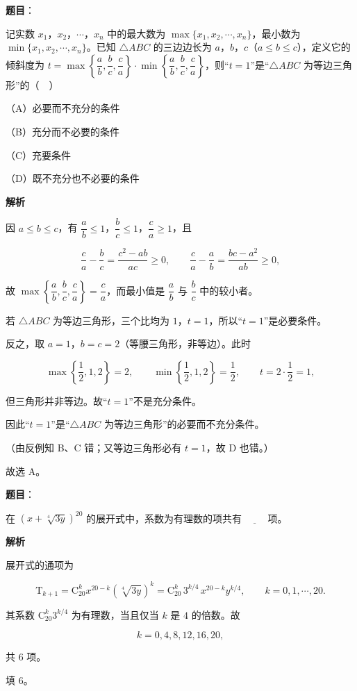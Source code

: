 \begin{answer}

\textbf{题目}：

记实数 $x_1$，$x_2$，$\cdots$，$x_n$ 中的最大数为 $\max\{x_1,x_2,\cdots,x_n\}$，最小数为 $\min\{x_1,x_2,\cdots,x_n\}$。已知 $\triangle ABC$ 的三边边长为 $a$，$b$，$c$（$a\leqslant b\leqslant c$），定义它的倾斜度为 $t=\max\left\{\dfrac ab,\dfrac bc,\dfrac ca\right\}\cdot\min\left\{\dfrac ab,\dfrac bc,\dfrac ca\right\}$，则“$t=1$”是“$\triangle ABC$ 为等边三角形”的（　）

（A）必要而不充分的条件

（B）充分而不必要的条件

（C）充要条件

（D）既不充分也不必要的条件

\textbf{解析}

因 $a\leqslant b\leqslant c$，有 $\dfrac ab\leqslant1$，$\dfrac bc\leqslant1$，$\dfrac ca\geqslant1$，且

\nopagebreak[4]
\[\frac ca-\frac bc=\frac{c^2-ab}{ac}\geqslant0,\qquad
\frac ca-\frac ab=\frac{bc-a^2}{ab}\geqslant0,\]

故 $\max\left\{\dfrac ab,\dfrac bc,\dfrac ca\right\}=\dfrac ca$，而最小值是 $\dfrac ab$ 与 $\dfrac bc$ 中的较小者。

若 $\triangle ABC$ 为等边三角形，三个比均为 $1$，$t=1$，所以“$t=1$”是必要条件。

反之，取 $a=1$，$b=c=2$（等腰三角形，非等边）。此时

\nopagebreak[4]
\[\max\left\{\frac12,1,2\right\}=2,\qquad \min\left\{\frac12,1,2\right\}=\frac12,\qquad t=2\cdot\frac12=1,\]

但三角形并非等边。故“$t=1$”不是充分条件。

因此“$t=1$”是“$\triangle ABC$ 为等边三角形”的必要而不充分条件。

（由反例知 B、C 错；又等边三角形必有 $t=1$，故 D 也错。）

故选 A。


\end{answer}
\begin{answer}

\textbf{题目}：

在 $\left(x+\sqrt[4]{3y}\right)^{20}$ 的展开式中，系数为有理数的项共有 $\underline{\qquad}$ 项。

\textbf{解析}

展开式的通项为

\nopagebreak[4]
\[\mathrm T_{k+1}=\mathrm C_{20}^k x^{20-k}\left(\sqrt[4]{3y}\right)^{k}
=\mathrm C_{20}^k\,3^{k/4}\,x^{20-k}y^{k/4},\qquad k=0,1,\cdots,20.\]

其系数 $\mathrm C_{20}^k3^{k/4}$ 为有理数，当且仅当 $k$ 是 $4$ 的倍数。故

\nopagebreak[4]
\[k=0,4,8,12,16,20,\]

共 $6$ 项。

填 $6$。


\end{answer}
